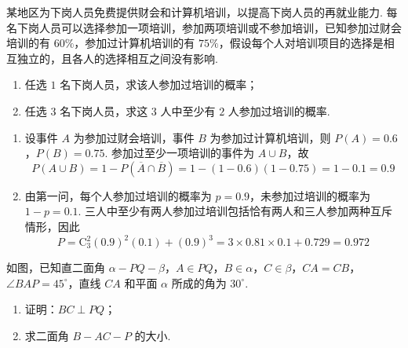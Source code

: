 \begin{problem}
某地区为下岗人员免费提供财会和计算机培训，以提高下岗人员的再就业能力. 每名下岗人员可以选择参加一项培训，参加两项培训或不参加培训，已知参加过财会培训的有 \(60\%\)，参加过计算机培训的有 \(75\%\)，假设每个人对培训项目的选择是相互独立的，且各人的选择相互之间没有影响.

\begin{enumerate}
\item 任选 \(1\) 名下岗人员，求该人参加过培训的概率；
\item 任选 \(3\) 名下岗人员，求这 \(3\) 人中至少有 \(2\) 人参加过培训的概率.
\end{enumerate}
\end{problem}

\begin{solution}
\begin{enumerate}
\item 设事件 \(A\) 为参加过财会培训，事件 \(B\) 为参加过计算机培训，则
\(P(A)=0.6\)，\(P(B)=0.75\). 参加过至少一项培训的事件为
\(A\cup B\)，故
\[
P(A\cup B)=1-P(\overline A\cap\overline B)
=1-(1-0.6)(1-0.75)=1-0.1=0.9
\]
\item 由第一问，每个人参加过培训的概率为 \(p=0.9\)，未参加过培训的概率为
\(1-p=0.1\). 三人中至少有两人参加过培训包括恰有两人和三人参加两种互斥情形，因此
\[
P=\mathrm C_3^2(0.9)^2(0.1)+(0.9)^3=3\times0.81\times0.1+0.729=0.972
\]
\end{enumerate}
\end{solution}

\begin{problem}
如图，已知直二面角 \(\alpha - PQ - \beta\)，\(A \in PQ\)，\(B \in \alpha\)，\(C \in \beta\)，\(CA = CB\)，\(\angle BAP = 45^{\circ}\)，直线 \(CA\) 和平面 \(\alpha\) 所成的角为 \(30^{\circ}\).

\begin{enumerate}
\item 证明：\(BC \perp PQ\)；
\item 求二面角 \(B - AC - P\) 的大小.
\end{enumerate}

\end{problem}

